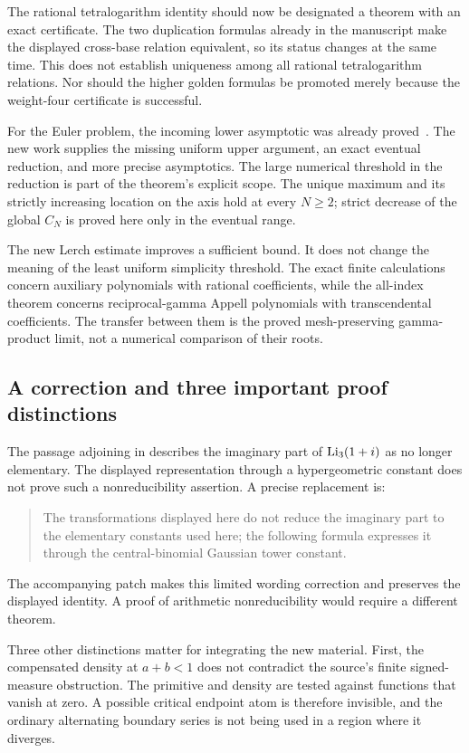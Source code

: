 The rational tetralogarithm identity should now be designated a
theorem with an exact certificate. The two duplication formulas
already in the manuscript make the displayed cross-base relation
equivalent, so its status changes at the same time. This does not
establish uniqueness among all rational tetralogarithm relations.
Nor should the higher golden formulas be promoted merely because
the weight-four certificate is successful.

For the Euler problem, the incoming lower asymptotic was already
proved~\cite{incoming-bounds}. The new work supplies the missing
uniform upper argument, an exact eventual reduction, and more precise
asymptotics. The large numerical threshold in the reduction is
part of the theorem's explicit scope. The unique maximum and its
strictly increasing location on the axis hold at every $N\ge2$;
strict decrease of the global $C_N$ is proved here only in the
eventual range.

The new Lerch estimate improves a sufficient bound. It does not
change the meaning of the least uniform simplicity threshold.
The exact finite calculations concern auxiliary polynomials with
rational coefficients, while the all-index theorem concerns
reciprocal-gamma Appell polynomials with transcendental coefficients.
The transfer between them is the proved mesh-preserving gamma-product
limit, not a numerical comparison of their roots.

\subsection{A correction and three important proof distinctions}

The passage adjoining  in
 describes the imaginary part of
$\operatorname{Li}_3(1+i)$ as no longer elementary. The displayed representation
through a hypergeometric constant does not prove such a
nonreducibility assertion. A precise replacement is:
\begin{quote}
The transformations displayed here do not reduce the imaginary part
to the elementary constants used here; the following formula expresses
it through the central-binomial Gaussian tower constant.
\end{quote}
The accompanying patch makes this limited wording correction and
preserves the displayed identity. A proof of arithmetic
nonreducibility would require a different theorem.

Three other distinctions matter for integrating the new material.
First, the compensated density at $a+b<1$ does not contradict the
source's finite signed-measure obstruction. The primitive and density
are tested against functions that vanish at zero. A possible critical
endpoint atom is therefore invisible, and the ordinary alternating
boundary series is not being used in a region where it diverges.

